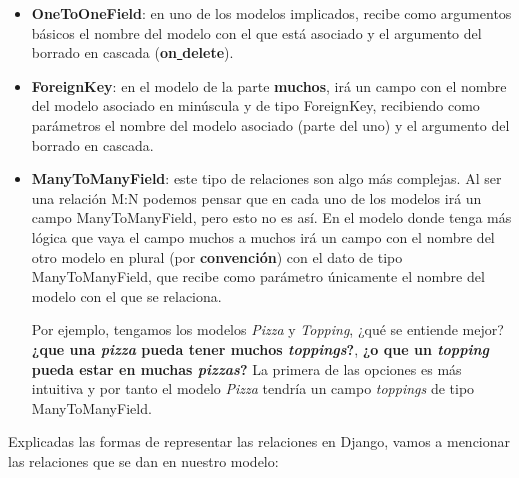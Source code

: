         \begin{itemize}
            \item \textbf{OneToOneField}: en uno de los modelos implicados, recibe como
            argumentos básicos el nombre del modelo con el que está asociado y el argumento
            del borrado en cascada (\textbf{on\underline{ }delete}).
            \item \textbf{ForeignKey}: en el modelo de la parte \textbf{muchos}, irá un campo
            con el nombre del modelo asociado en minúscula y de tipo ForeignKey, recibiendo
            como parámetros el nombre del modelo asociado (parte del uno) y el argumento del
            borrado en cascada.
            \item \textbf{ManyToManyField}: este tipo de relaciones son algo más complejas. Al
            ser una relación M:N podemos pensar que en cada uno de los modelos irá un campo
            ManyToManyField, pero esto no es así. En el modelo donde tenga más lógica que vaya
            el campo muchos a muchos irá un campo con el nombre del otro modelo en plural (por
            \textbf{convención}) con el dato de tipo ManyToManyField, que recibe como parámetro
            únicamente el nombre del modelo con el que se relaciona.

            Por ejemplo, tengamos los modelos \textit{Pizza} y \textit{Topping}, ¿qué se
            entiende mejor? \textbf{¿que una \textit{pizza} pueda tener muchos
            \textit{toppings}?}, \textbf{¿o que un \textit{topping} pueda estar en muchas
            \textit{pizzas}?} La primera de las opciones es más intuitiva y por tanto el
            modelo \textit{Pizza} tendría un campo \textit{toppings} de tipo ManyToManyField.
        \end{itemize}

    Explicadas las formas de representar las relaciones en Django, vamos a mencionar las
    relaciones que se dan en nuestro modelo:

